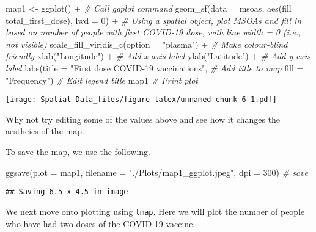 \documentclass[
]{book}
\newenvironment{Shaded}{\begin{snugshade}}{\end{snugshade}}
\newcommand{\AttributeTok}[1]{\textcolor[rgb]{0.77,0.63,0.00}{#1}}
\newcommand{\CommentTok}[1]{\textcolor[rgb]{0.56,0.35,0.01}{\textit{#1}}}
\newcommand{\DecValTok}[1]{\textcolor[rgb]{0.00,0.00,0.81}{#1}}
\newcommand{\FunctionTok}[1]{\textcolor[rgb]{0.00,0.00,0.00}{#1}}
\newcommand{\NormalTok}[1]{#1}
\newcommand{\OtherTok}[1]{\textcolor[rgb]{0.56,0.35,0.01}{#1}}
\newcommand{\SpecialCharTok}[1]{\textcolor[rgb]{0.00,0.00,0.00}{#1}}
\newcommand{\StringTok}[1]{\textcolor[rgb]{0.31,0.60,0.02}{#1}}
\begin{document}
\begin{Shaded}
\begin{Highlighting}[]
\NormalTok{map1 }\OtherTok{\textless{}{-}} \FunctionTok{ggplot}\NormalTok{() }\SpecialCharTok{+} \CommentTok{\# Call ggplot command}
            \FunctionTok{geom\_sf}\NormalTok{(}\AttributeTok{data =}\NormalTok{ msoas, }\FunctionTok{aes}\NormalTok{(}\AttributeTok{fill =}\NormalTok{ total\_first\_dose), }\AttributeTok{lwd =} \DecValTok{0}\NormalTok{) }\SpecialCharTok{+} \CommentTok{\# Using a spatial object, plot MSOAs and fill in based on number of people with first COVID{-}19 dose, with line width = 0 (i.e., not visible)}
            \FunctionTok{scale\_fill\_viridis\_c}\NormalTok{(}\AttributeTok{option =} \StringTok{"plasma"}\NormalTok{) }\SpecialCharTok{+} \CommentTok{\# Make colour{-}blind friendly}
            \FunctionTok{xlab}\NormalTok{(}\StringTok{"Longitude"}\NormalTok{) }\SpecialCharTok{+} \CommentTok{\# Add x{-}axis label}
            \FunctionTok{ylab}\NormalTok{(}\StringTok{"Latitude"}\NormalTok{) }\SpecialCharTok{+} \CommentTok{\# Add y{-}axis label}
            \FunctionTok{labs}\NormalTok{(}\AttributeTok{title =} \StringTok{"First dose COVID{-}19 vaccinations"}\NormalTok{, }\CommentTok{\# Add title to map}
                 \AttributeTok{fill =} \StringTok{"Frequency"}\NormalTok{) }\CommentTok{\# Edit legend title}
\NormalTok{map1 }\CommentTok{\# Print plot}
\end{Highlighting}
\end{Shaded}

\texttt{[image: Spatial-Data\_files/figure-latex/unnamed-chunk-6-1.pdf]}

Why not try editing some of the values above and see how it changes the aestheics of the map.

To save the map, we use the following.

\begin{Shaded}
\begin{Highlighting}[]
\FunctionTok{ggsave}\NormalTok{(}\AttributeTok{plot =}\NormalTok{ map1, }\AttributeTok{filename =} \StringTok{"./Plots/map1\_ggplot.jpeg"}\NormalTok{, }\AttributeTok{dpi =} \DecValTok{300}\NormalTok{) }\CommentTok{\# save}
\end{Highlighting}
\end{Shaded}

\begin{verbatim}
## Saving 6.5 x 4.5 in image
\end{verbatim}

We next move onto plotting using \texttt{tmap}. Here we will plot the number of people who have had two doses of the COVID-19 vaccine.
\end{document}

